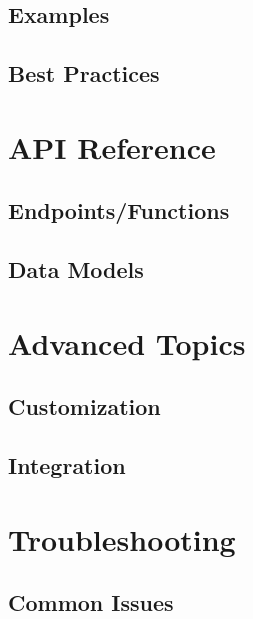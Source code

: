 \documentclass[a4paper,12pt]{article} %
\begin{document}
    \subsection{Examples}

    \subsection{Best Practices}


    \section{API Reference}

    \subsection{Endpoints/Functions}

    \subsection{Data Models}


    \section{Advanced Topics}

    \subsection{Customization}

    \subsection{Integration}


    \section{Troubleshooting}

    \subsection{Common Issues}
\end{document}
